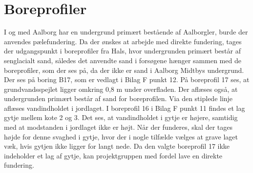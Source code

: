 \section{Boreprofiler} 
I og med Aalborg har en undergrund primært bestående af Aalborgler, burde der anvendes pælefundering. Da der ønskes at arbejde med direkte fundering, tages der udgangspunkt i boreprofiler fra Hals, hvor undergrunden primært består af senglacialt sand, således det anvendte sand i forsøgene hænger sammen med de boreprofiler, som der ses på, da der ikke er sand i Aalborg Midtbys undergrund. Der ses på boring B17, som er vedlagt i Bilag F punkt 12.  
\newline \indent{     }  På boreprofil 17 ses, at grundvandsspejlet ligger omkring 0,8 m under overfladen. Der aflæses også, at undergrunden primært består af sand for boreprofilen. Via den stiplede linje aflæses vandindholdet i jordlaget. 
\newline \indent{     }  I boreprofil 16 i Bilag F punkt 11 findes et lag gytje mellem kote 2 og 3. Det ses, at vandindholdet i gytje er højere, samtidig med at modstanden i jordlaget ikke er højt. Når der funderes, skal der tages højde for denne svaghed i gytje, hvor der i nogle tilfælde vælges at grave laget væk, hvis gytjen ikke ligger for langt nede. Da den valgte boreprofil 17 ikke indeholder et lag af gytje, kan projektgruppen med fordel lave en direkte fundering.